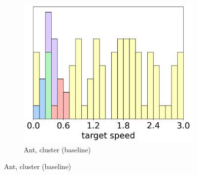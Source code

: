 \begin{figure}[t]
\begin{center}
\begin{subfigure}{0.3\textwidth}
    \end{subfigure}\hspace{10pt}%
    \begin{subfigure}{0.3\textwidth}
        \centering
        \caption{Ant, cluster (baseline)}
        \includegraphics[width=\linewidth]{pics/histograms/cluster/Ant.png}
    \end{subfigure}
    

\end{center}
\end{figure}
